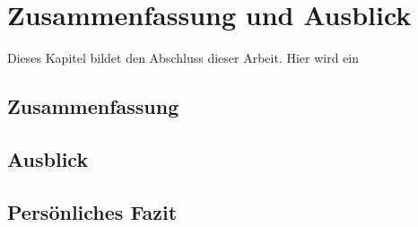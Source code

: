 \section{Zusammenfassung und Ausblick}
Dieses Kapitel bildet den Abschluss dieser Arbeit.  Hier wird ein 
\subsection{Zusammenfassung}
\subsection{Ausblick}
\label{sec:ausblick}

\subsection{Persönliches Fazit}


